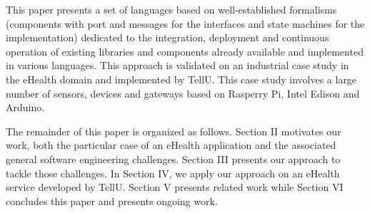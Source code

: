 This paper presents a set of languages based on well-established formalisms (components with port and messages for the interfaces and state machines for the implementation)  dedicated to the integration, deployment and continuous operation of existing libraries and components already available and implemented in various languages. This approach is validated on an industrial case study in the eHealth domain and implemented by TellU. This case study involves a large number of sensors, devices and gateways based on Rasperry Pi, Intel Edison and Arduino. 

The remainder of this paper is organized as follows. Section II  motivates our work, both the particular case of an eHealth application and the associated general software engineering challenges. Section III presents our approach to tackle those challenges. In Section IV, we apply our approach on an eHealth service developed by TellU. Section V presents related work while Section VI concludes this paper and presents ongoing work. 
